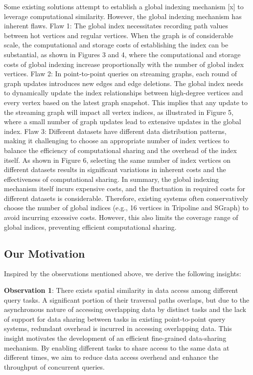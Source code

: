 \documentclass[lettersize,journal]{IEEEtran} %
\begin{document}
Some existing solutions attempt to establish a global indexing mechanism [x] to leverage computational similarity. However, the global indexing mechanism has inherent flaws. Flaw 1: The global index necessitates recording path values between hot vertices and regular vertices. When the graph is of considerable scale, the computational and storage costs of establishing the index can be substantial, as shown in Figures 3 and 4, where the computational and storage costs of global indexing increase proportionally with the number of global index vertices. Flaw 2: In point-to-point queries on streaming graphs, each round of graph updates introduces new edges and edge deletions. The global index needs to dynamically update the index relationships between high-degree vertices and every vertex based on the latest graph snapshot. This implies that any update to the streaming graph will impact all vertex indices, as illustrated in Figure 5, where a small number of graph updates lead to extensive updates in the global index. Flaw 3: Different datasets have different data distribution patterns, making it challenging to choose an appropriate number of index vertices to balance the efficiency of computational sharing and the overhead of the index itself. As shown in Figure 6, selecting the same number of index vertices on different datasets results in significant variations in inherent costs and the effectiveness of computational sharing. In summary, the global indexing mechanism itself incurs expensive costs, and the fluctuation in required costs for different datasets is considerable. Therefore, existing systems often conservatively choose the number of global indices (e.g., 16 vertices in Tripoline and SGraph) to avoid incurring excessive costs. However, this also limits the coverage range of global indices, preventing efficient computational sharing. 



\subsection{Our Motivation}
Inspired by the observations mentioned above, we derive the following insights:

{\bf{Observation 1}}: There exists spatial similarity in data access among different query tasks. A significant portion of their traversal paths overlaps, but due to the asynchronous nature of accessing overlapping data by distinct tasks and the lack of support for data sharing between tasks in existing point-to-point query systems, redundant overhead is incurred in accessing overlapping data. This insight motivates the development of an efficient fine-grained data-sharing mechanism. By enabling different tasks to share access to the same data at different times, we aim to reduce data access overhead and enhance the throughput of concurrent queries.
\end{document}
